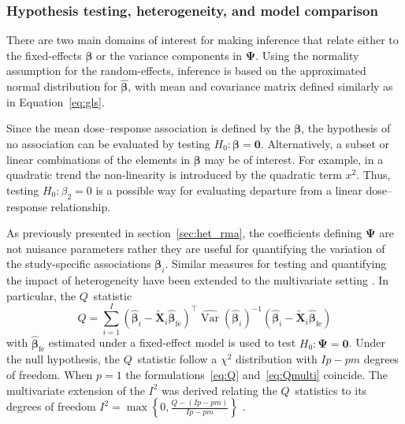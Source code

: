 \documentclass[11pt,a4paper,twoside,openany]{book}\usepackage{knitr}
\DeclareMathOperator{\Var}{Var}
\begin{document}
{{\subsubsection*{Hypothesis testing, heterogeneity, and model comparison}

There are two main domains of interest for making inference that relate either to the fixed-effects $\boldsymbol{\beta}$ or the variance components in $\boldsymbol{\Psi}$. Using the normality assumption for the random-effects, inference is based on the approximated normal distribution for $\boldsymbol{\hat \beta}$, with mean and covariance matrix defined similarly as in Equation~\ref{eq:gls}.

\noindent Since the mean dose--response association is defined by the $\boldsymbol \beta$, the hypothesis of no association can be evaluated by testing $H_0: \boldsymbol{\beta} = \boldsymbol{0}$. 
Alternatively, a subset or linear combinations of the elements in $\boldsymbol \beta$ may be of interest. For example, in a quadratic trend the non-linearity is introduced by the quadratic term $x^2$. Thus, testing $H_0: \beta_2 = 0$ is a possible way for evaluating departure from a linear dose--response relationship.

As previously presented in section~\ref{sec:het_rma}, the coefficients defining $\boldsymbol{\Psi}$ are not nuisance parameters rather they are useful for quantifying the variation of the study-specific associations $\boldsymbol{\beta}_i$. Similar measures for testing and quantifying the impact of heterogeneity have been extended to the multivariate setting \citep{berkey1996multiple}. In particular, the $Q$~statistic
\begin{equation}
Q = \sum_{i=1}^I \left(\boldsymbol{\hat \beta}_i - \widetilde{\mathbf{X}}_i\boldsymbol{\hat \beta}_{\text{fe}}\right) ^\top \widehat{\Var} \left( \boldsymbol{\hat \beta}_i \right)^{-1} \left(\boldsymbol{\hat \beta}_i - \widetilde{\mathbf{X}}_i\boldsymbol{\hat \beta}_{\text{fe}}\right)
\label{eq:Qmulti}
\end{equation}
\noindent with $\boldsymbol{\hat \beta}_{\text{fe}}$ estimated under a fixed-effect model is used to test $H_0: \boldsymbol{\Psi} = \boldsymbol{0}$. Under the null hypothesis, the $Q$~statistic follow a $\chi^2$ distribution with $Ip - pm$ degrees of freedom. When $p = 1$ the formulations~\ref{eq:Q} and~\ref{eq:Qmulti} coincide. The multivariate extension of the $I^2$ was derived relating the $Q$~statistics to its degrees of freedom $I^2 = \max \left\{0, \frac{Q- (Ip - pm)}{Ip - pm}\right\}$ \citep{jackson2012quantifying}.

}}
\end{document}
